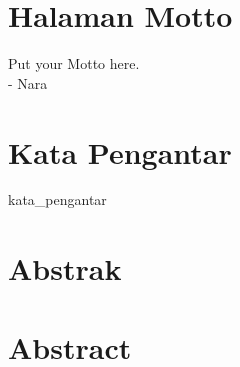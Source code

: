 \documentclass[oneside, 12pt, a4paper]{book}
\numberwithin{equation}{chapter}
\numberwithin{algorithm}{chapter}
\begin{document}
\chapter{Halaman Motto}

\vspace{11cm}

\begin{center}
Put your Motto here.\\
- Nara
\end{center}


\clearpage
\vspace{30pt}
\chapter{Kata Pengantar}
\vspace{10pt}

\begin{doublespace}

{kata_pengantar}
	
\end{doublespace}


\clearpage
\chapter{\centering Abstrak}
\begin{quotation}
\end{quotation}


\clearpage
\chapter{\centering Abstract}
\begin{quotation}
\end{quotation}




\setcounter{tocdepth}{2}
\renewcommand{\thechapter}{\Roman{chapter}} %
\clearpage
\tableofcontents

\setcounter{tocdepth}{2}
\renewcommand{\thechapter}{\arabic{chapter}} %
\end{document}
